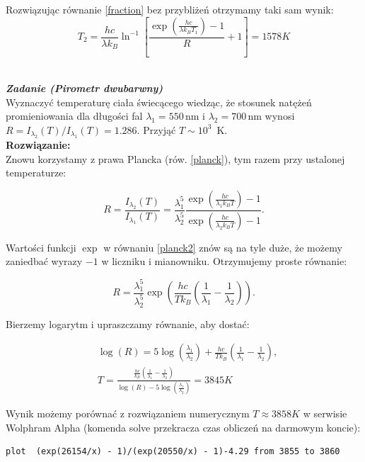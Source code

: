 \documentclass[11pt,a4paper]{article}
\newcounter{zadanie}\newcommand{\zadanie}[1][]{\addtocounter{zadanie}{1} ~\\  {\bf \emph{Zadanie \arabic{zadanie} #1 }} \\}
\begin{document}
Rozwiązując równanie \eqref{fraction} bez przybliżeń otrzymamy taki sam wynik:
\begin{equation}
T_2 = \frac{hc}{\lambda k_{B}} \ln^{-1}\left[\frac{\exp\left(\frac{h c}{\lambda k_B T_1}\right)-1}{R}+1 \right] = 1578 K
\end{equation}

\newpage

\zadanie [(Pirometr dwubarwny)]
Wyznaczyć temperaturę ciała świecącego wiedząc, że stosunek natężeń promieniowania dla długości fal
$\lambda_1=550$\,nm i $\lambda_2=700$\,nm wynosi $R=I_{\lambda_2}(T)/I_{\lambda_1}(T) =1.286$.
Przyjąć $T \sim 10^{3}$~K.\\

\vskip 10pt
\textbf{Rozwiązanie:}\\
Znowu korzystamy z prawa Plancka (rów. \eqref{planck}), tym razem przy ustalonej temperaturze:

\begin{equation}
  R = \frac{I_{\lambda_2}(T)}{I_{\lambda_1}(T)} =
  \frac{\lambda_1^5}{\lambda_2^5}
  \frac{\exp\left(\frac{h c}{\lambda_1 k_B T}\right)-1}{\exp\left(\frac{h c}{\lambda_2 k_B T}\right)-1}. \label{planck2}
\end{equation}

Wartości funkcji $\exp$ w równaniu \eqref{planck2} znów są na tyle duże, że możemy zaniedbać
wyrazy $-1$ w liczniku i mianowniku. Otrzymujemy proste równanie:

\begin{equation}
R = \frac{\lambda_1^5}{\lambda_2^5} \exp\left(\frac{h c}{T k_B}\left( \frac{1}{\lambda_1}-\frac{1}{\lambda_2}\right)\right).
\end{equation}

Bierzemy logarytm i upraszczamy równanie, aby dostać:

\begin{align}
&\log(R) = 5 \log\left(\frac{\lambda_1}{\lambda_2}\right) + \frac{h c}{T k_B}\left( \frac{1}{\lambda_1}-\frac{1}{\lambda_2}\right),\\
  &T = \frac{\frac{h c}{k_B}\left( \frac{1}{\lambda_1}-
    \frac{1}{\lambda_2}\right)}{\log(R)-5 \log\left(\frac{\lambda_1}{\lambda_2}\right)} =  3845K
\end{align}

Wynik możemy porównać z rozwiązaniem numerycznym $T \approx 3858K$ w serwisie Wolphram Alpha
(komenda solve przekracza czas obliczeń na darmowym koncie):
\begin{verbatim}
plot  (exp(26154/x) - 1)/(exp(20550/x) - 1)-4.29 from 3855 to 3860
\end{verbatim}
\end{document}
